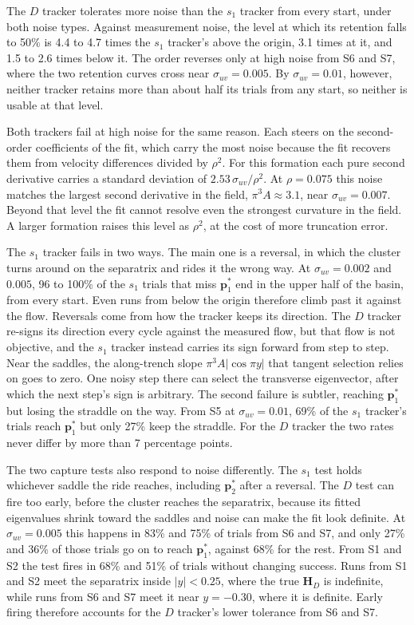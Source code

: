 \documentclass[lettersize,journal]{IEEEtran}
\begin{document}
The $D$ tracker tolerates more noise than the $s_1$ tracker from every
start, under both noise types. Against measurement noise, the level at
which its retention falls to 50\% is 4.4 to 4.7 times the $s_1$ tracker's
above the origin, 3.1 times at it, and 1.5 to 2.6 times below it. The
order reverses only at high noise from S6 and S7, where the two retention
curves cross near $\sigma_{uv} = 0.005$. By $\sigma_{uv} = 0.01$, however,
neither tracker retains more than about half its trials from any start, so
neither is usable at that level.

Both trackers fail at high noise for the same reason. Each steers on the
second-order coefficients of the fit, which carry the most noise because
the fit recovers them from velocity differences divided by $\rho^2$. For
this formation each pure second derivative carries a standard deviation of
$2.53\,\sigma_{uv}/\rho^2$. At $\rho = 0.075$ this noise matches the
largest second derivative in the field, $\pi^3 A \approx 3.1$, near
$\sigma_{uv} = 0.007$. Beyond that level the fit cannot resolve even the
strongest curvature in the field. A larger formation raises this level as
$\rho^2$, at the cost of more truncation error.

The $s_1$ tracker fails in two ways. The main one is a reversal, in which
the cluster turns around on the separatrix and rides it the wrong way. At
$\sigma_{uv} = 0.002$ and $0.005$, 96 to 100\% of the $s_1$ trials that
miss $\mathbf{p}^*_1$ end in the upper half of the basin, from every start.
Even runs from below the origin therefore climb past it against the flow.
Reversals come from how the tracker keeps its direction. The $D$ tracker
re-signs its direction every cycle against the measured flow, but that flow
is not objective, and the $s_1$ tracker instead carries its sign forward
from step to step. Near the saddles, the along-trench slope
$\pi^3 A|\cos\pi y|$ that tangent selection relies on goes to zero. One
noisy step there can select the transverse eigenvector, after which the
next step's sign is arbitrary. The second failure is subtler, reaching
$\mathbf{p}^*_1$ but losing the straddle on the way. From S5 at
$\sigma_{uv} = 0.01$, 69\% of the $s_1$ tracker's trials reach
$\mathbf{p}^*_1$ but only 27\% keep the straddle. For the $D$ tracker the
two rates never differ by more than 7 percentage points.

The two capture tests also respond to noise differently. The $s_1$ test
holds whichever saddle the ride reaches, including $\mathbf{p}^*_2$ after a
reversal. The $D$ test can fire too early, before the cluster reaches the
separatrix, because its fitted eigenvalues shrink toward the saddles and
noise can make the fit look definite. At $\sigma_{uv} = 0.005$ this happens
in 83\% and 75\% of trials from S6 and S7, and only 27\% and 36\% of those
trials go on to reach $\mathbf{p}^*_1$, against 68\% for the rest. From S1
and S2 the test fires in 68\% and 51\% of trials without changing success.
Runs from S1 and S2 meet the separatrix inside $|y| < 0.25$, where the true $\mathbf{H}_D$ is indefinite,
while runs from S6 and S7 meet it near $y = -0.30$, where it is definite.
Early firing therefore accounts for the $D$ tracker's lower tolerance from
S6 and S7.
\end{document}
